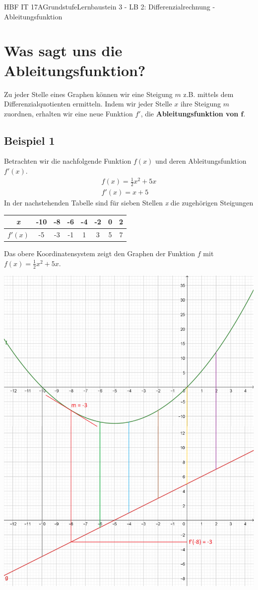 \documentclass[11pt,twocolumn,oneside,openany,headings=optiontotoc,11pt,numbers=noenddot]{article}
\begin{document}
	\begin{worksheet}{HBF IT 17A}{Grundstufe}{Lernbaustein 3 - LB 2: Differenzialrechnung - Ableitungsfunktion}
		\section{Was sagt uns die Ableitungsfunktion?}
		Zu jeder Stelle eines Graphen können wir eine Steigung \(m\) z.B. mittels dem Differenzialquotienten ermitteln. 
		Indem wir jeder Stelle \(x\) ihre Steigung \(m\) zuordnen, erhalten wir eine neue Funktion \(f'\), die \textbf{Ableitungsfunktion von \(\mathbf{f}\)}.
		\subsection*{Beispiel 1}
		Betrachten wir die nachfolgende Funktion \(f(x)\) und deren Ableitungsfunktion \(f'(x)\).
		\begin{align*}
			f(x) = \frac{1}{2}x^2+5x\\
			f'(x) = x + 5
		\end{align*}
		In der nachstehenden Tabelle sind für sieben Stellen \textit{x} die zugehörigen Steigungen
		\begin{center}
			\begin{tabular}{c|c|c|c|c|c|c|c}
				\textit{x} & -10 & -8 & -6 & -4 & -2 & 0 & 2\\
				\hline
				\(f'(x)\) & -5 & -3 & -1 & 1 & 3 & 5 & 7
			\end{tabular}
		\end{center}
		Das obere Koordinatensystem zeigt den Graphen der Funktion \(f\) mit \(f(x) = \frac{1}{2}x^2+5x\).\\
		\par\noindent
		\includegraphics[scale=0.26]{Bilder/ff'.png}\\

\end{worksheet}
\end{document}
